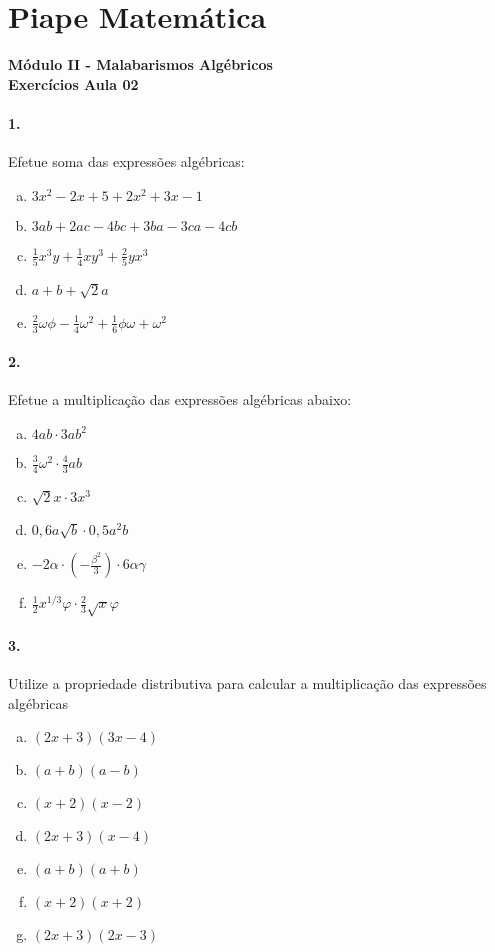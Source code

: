 \documentclass[a4paper,twocolumn,12pt]{article}
\begin{document}
 
  
\section*{Piape Matemática} 
\textbf{Módulo II - Malabarismos Algébricos}\\
\textbf{Exercícios Aula 02}         

\paragraph{1.} Efetue soma das expressões algébricas:
\begin{enumerate}[a)]
\item $3x^2 - 2x + 5 + 2x^2 + 3x - 1$
\item $3ab + 2ac - 4bc + 3ba - 3ca -4cb$
\item $\displaystyle\frac{1}{5}x^3y + \frac{1}{4}xy^3 + \frac{2}{5}yx^3$
\item $a + b + \sqrt{2}a$
\item $\frac{2}{3}\omega\phi - \frac{1}{4}\omega^2 + \frac{1}{6}\phi\omega + \omega^2$
\end{enumerate}

\paragraph*{2.} Efetue a multiplicação das expressões algébricas abaixo:

\begin{enumerate}[a)]
\item $4ab \cdot 3ab^2$
\item $\displaystyle\frac{3}{4}\omega^2 \cdot \frac{4}{3}ab$
\item $\sqrt{2}x \cdot 3x^3$
\item $0,\!6 a\sqrt{b} \cdot 0,\!5 a^2b$
\item $\displaystyle-2\alpha \cdot \left(-\frac{\beta^2}{3}\right) \cdot 6\alpha\gamma$
\item $\displaystyle\frac{1}{2}x^{1/3}\varphi \cdot \frac{2}{3}\sqrt{x}\varphi$ 
\end{enumerate}


\paragraph{3.} Utilize a propriedade distributiva para calcular a multiplicação das expressões algébricas
\begin{enumerate}[a)]
\item $(2x + 3)(3x - 4)$
\item $(a + b)(a - b)$
\item $(x + 2)(x - 2)$
\item $(2x + 3)(x - 4)$
\item $(a + b)(a + b)$
\item $(x + 2)(x + 2)$
\item $(2x + 3)(2x - 3)$ 
\end{enumerate}
\newpage
\end{document}
